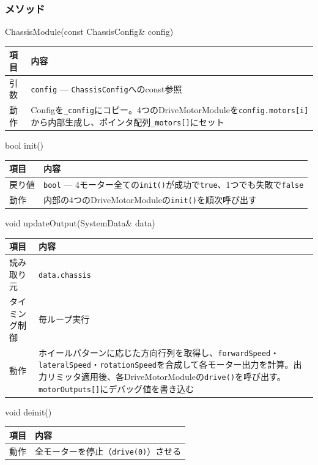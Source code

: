\subsubsection{メソッド}

\begin{funcblock}{ChassisModule(const ChassisConfig\& config)}
\begin{tabularx}{\textwidth}{l X}
\toprule
\textbf{項目} & \textbf{内容} \\
\midrule
引数   & \texttt{config} --- \texttt{ChassisConfig}へのconst参照 \\
動作   & Configを\texttt{\_config}にコピー。4つのDriveMotorModuleを\texttt{config.motors[i]}から内部生成し、ポインタ配列\texttt{\_motors[]}にセット \\
\bottomrule
\end{tabularx}
\end{funcblock}

\begin{funcblock}{bool init()}
\begin{tabularx}{\textwidth}{l X}
\toprule
\textbf{項目} & \textbf{内容} \\
\midrule
戻り値   & \texttt{bool} --- 4モーター全ての\texttt{init()}が成功で\texttt{true}、1つでも失敗で\texttt{false} \\
動作     & 内部の4つのDriveMotorModuleの\texttt{init()}を順次呼び出す \\
\bottomrule
\end{tabularx}
\end{funcblock}

\begin{funcblock}{void updateOutput(SystemData\& data)}
\begin{tabularx}{\textwidth}{l X}
\toprule
\textbf{項目} & \textbf{内容} \\
\midrule
読み取り元     & \texttt{data.chassis} \\
タイミング制御 & 毎ループ実行 \\
動作           & ホイールパターンに応じた方向行列を取得し、\texttt{forwardSpeed}・\texttt{lateralSpeed}・\texttt{rotationSpeed}を合成して各モーター出力を計算。出力リミッタ適用後、各DriveMotorModuleの\texttt{drive()}を呼び出す。\texttt{motorOutputs[]}にデバッグ値を書き込む \\
\bottomrule
\end{tabularx}
\end{funcblock}

\begin{funcblock}{void deinit()}
\begin{tabularx}{\textwidth}{l X}
\toprule
\textbf{項目} & \textbf{内容} \\
\midrule
動作   & 全モーターを停止（\texttt{drive(0)}）させる \\
\bottomrule
\end{tabularx}
\end{funcblock}


